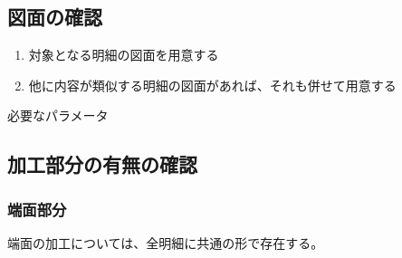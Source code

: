 \subsection{図面の確認}
\begin{enumerate}
\item 対象となる明細の図面を用意する
\item 他に内容が類似する明細の図面があれば、それも併せて用意する
\end{enumerate}
\begin{Parameter}{必要なパラメータ}
%
%
\end{Parameter}


\subsection{加工部分の有無の確認}

\subsubsection{端面部分}
端面の加工については、全明細に共通の形で存在する。

